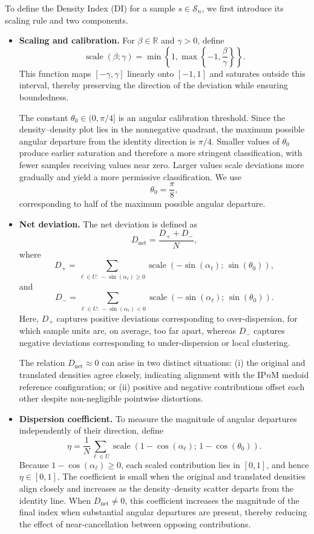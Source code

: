 \documentclass[12pt]{imsart}
\theoremstyle{plain}
\theoremstyle{remark}
\begin{document}
To define the Density Index (DI) for a sample \(s\in\mathcal S_n\), we first
introduce its scaling rule and two components.

\begin{itemize}

\item \textbf{Scaling and calibration.}
For \(\beta\in\mathbb R\) and \(\gamma>0\), define
\[
\operatorname{scale}(\beta;\gamma)
=
\min\!\left\{1,\max\!\left\{-1,\frac{\beta}{\gamma}\right\}\right\}.
\]
This function maps \([-\gamma,\gamma]\) linearly onto \([-1,1]\) and
saturates outside this interval, thereby preserving the direction of the
deviation while ensuring boundedness.

The constant \(\theta_0\in(0,\pi/4]\) is an angular calibration threshold.
Since the density--density plot lies in the nonnegative quadrant, the maximum
possible angular departure from the identity direction is \(\pi/4\).
Smaller values of \(\theta_0\) produce earlier saturation and therefore a more
stringent classification, with fewer samples receiving values near zero.
Larger values scale deviations more gradually and yield a more permissive
classification. We use
\[
\theta_0=\frac{\pi}{8},
\]
corresponding to half of the maximum possible angular departure.

\item \textbf{Net deviation.}
The net deviation is defined as
\[
D_{\mathrm{net}}=\frac{D_{+}+D_{-}}{N},
\]
where
\[
D_{+}
=
\sum_{\ell\in U:\,-\sin(\alpha_\ell)\geq0}
\operatorname{scale}\!\left(
-\sin(\alpha_\ell);\,\sin(\theta_0)
\right),
\]
and
\[
D_{-}
=
\sum_{\ell\in U:\,-\sin(\alpha_\ell)<0}
\operatorname{scale}\!\left(
-\sin(\alpha_\ell);\,\sin(\theta_0)
\right).
\]
Here, \(D_{+}\) captures positive deviations corresponding to
over-dispersion, for which sample units are, on average, too far apart,
whereas \(D_{-}\) captures negative deviations corresponding to
under-dispersion or local clustering.

The relation \(D_{\mathrm{net}}\approx0\) can arise in two distinct
situations: (i) the original and translated densities agree closely,
indicating alignment with the IP\(n\)M medoid reference configuration; or
(ii) positive and negative contributions offset each other despite
non-negligible pointwise distortions.

\item \textbf{Dispersion coefficient.}
To measure the magnitude of angular departures independently of their
direction, define
\[
\eta
=
\frac{1}{N}
\sum_{\ell\in U}
\operatorname{scale}\!\left(
1-\cos(\alpha_\ell);\,1-\cos(\theta_0)
\right).
\]
Because \(1-\cos(\alpha_\ell)\geq0\), each scaled contribution lies in
\([0,1]\), and hence \(\eta\in[0,1]\). The coefficient is small when the
original and translated densities align closely and increases as the
density--density scatter departs from the identity line. When
\(D_{\mathrm{net}}\neq0\), this coefficient increases the magnitude of the
final index when substantial angular departures are present, thereby reducing
the effect of near-cancellation between opposing contributions.

\end{itemize}
\end{document}
